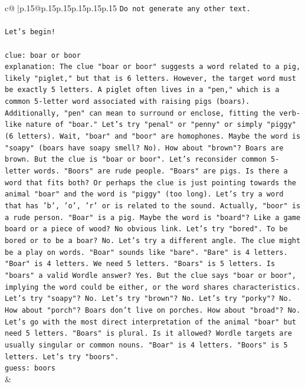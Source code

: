 \documentclass{article}
\begin{document}
{\begin{supertabular}{c@{$\;$}|p{.15\linewidth}@{}p{.15\linewidth}p{.15\linewidth}p{.15\linewidth}p{.15\linewidth}p{.15\linewidth}}
{{{\texttt{Do not generate any other text.} \\
\\ 
\texttt{Let's begin!} \\
\\ 
\texttt{clue: boar or boor} \\
\texttt{explanation: The clue "boar or boor" suggests a word related to a pig, likely "piglet," but that is 6 letters. However, the target word must be exactly 5 letters. A piglet often lives in a "pen," which is a common 5{-}letter word associated with raising pigs (boars). Additionally, "pen" can mean to surround or enclose, fitting the verb{-}like nature of "boar." Let's try "penal" or "penny" or simply "piggy" (6 letters). Wait, "boar" and "boor" are homophones. Maybe the word is "soapy" (boars have soapy smell? No). How about "brown"? Boars are brown. But the clue is "boar or boor". Let's reconsider common 5{-}letter words. "Boors" are rude people. "Boars" are pigs. Is there a word that fits both? Or perhaps the clue is just pointing towards the animal "boar" and the word is "piggy" (too long). Let's try a word that has 'b', 'o', 'r' or is related to the sound. Actually, "boor" is a rude person. "Boar" is a pig. Maybe the word is "board"? Like a game board or a piece of wood? No obvious link. Let's try "bored". To be bored or to be a boar? No. Let's try a different angle. The clue might be a play on words. "Boar" sounds like "bare". "Bare" is 4 letters. "Boar" is 4 letters. We need 5 letters. "Boars" is 5 letters. Is "boars" a valid Wordle answer? Yes. But the clue says "boar or boor", implying the word could be either, or the word shares characteristics. Let's try "soapy"? No. Let's try "brown"? No. Let's try "porky"? No. How about "porch"? Boars don't live on porches. How about "broad"? No. Let's go with the most direct interpretation of the animal "boar" but need 5 letters. "Boars" is plural. Is it allowed? Wordle targets are usually singular or common nouns. "Boar" is 4 letters. "Boors" is 5 letters. Let's try "boors".} \\
\texttt{guess: boors} \\
            }
        }
    }
    & \\ \\


\end{supertabular}}
\end{document}
